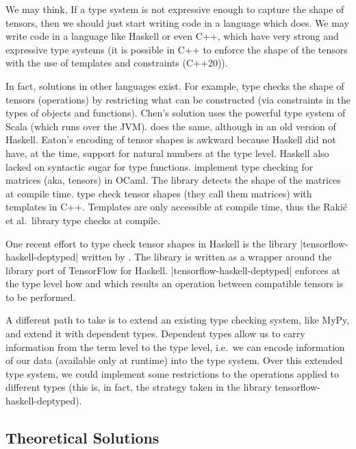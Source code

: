 We may think, If a type system is not expressive enough to capture the
shape of tensors, then we should just start writing code in a language
which does. We may write code in a language like Haskell or even C++,
which have very strong and expressive type systems (it is possible in
C++ to enforce the shape of the tensors with the use of templates and
constraints (C++20)).

In fact, solutions in other languages exist. For example,
\textcite{chen_typesafe_2017} type checks the shape of tensors
(operations) by restricting what can be constructed (via constraints in
the types of objects and functions). Chen's solution uses the powerful
type system of Scala (which runs over the JVM).
\textcite{eaton_statically_2006} does the same, although in an old
version of Haskell. Eaton's encoding of tensor shapes is awkward because
Haskell did not have, at the time, support for natural numbers at the
type level. Haskell also lacked on syntactic sugar for type functions.
\textcite{abe_simple_2015} implement type checking for matrices (aka,
tensors) in OCaml. The library detects the shape of the matrices at
compile time. \textcite{rakic_statically_2012} type check tensor shapes
(they call them matrices) with templates in C++. Templates are only
accessible at compile time, thus the Rakić et al.~library type checks at
compile.

One recent effort to type check tensor shapes in Haskell is the library
\pycode|tensorflow-haskell-deptyped| written by
\textcite{elkin_haskell_2018}. The library is written as a wrapper
around the library port of TensorFlow for Haskell.
\pycode|tensorflow-haskell-deptyped| enforces at the type level how and
which results an operation between compatible tensors is to be performed.

A different path to take is to extend an existing type checking system,
like MyPy, and extend it with dependent types. Dependent types allow us
to carry information from the term level to the type level, i.e.~we can
encode information of our data (available only at runtime) into the type
system. Over this extended type system, we could implement some
restrictions to the operations applied to different types (this is, in
fact, the strategy taken in the library tensorflow-haskell-deptyped).

\subsection{Theoretical Solutions}\label{theoretical-solutions}

